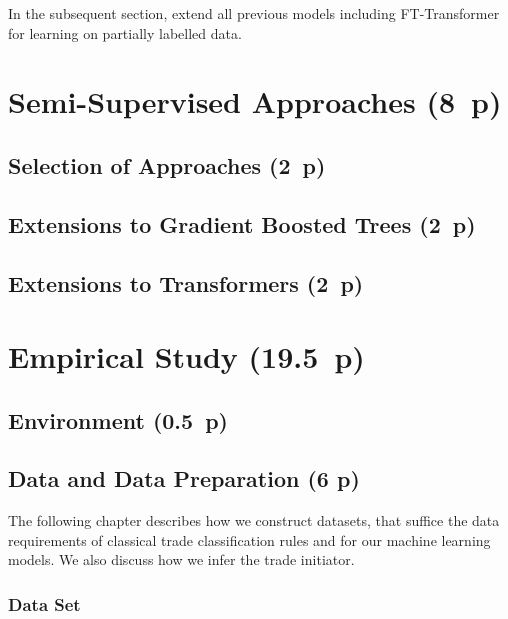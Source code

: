 In the subsequent section, extend all previous models including FT-Transformer for learning on partially labelled data.

\newpage
\section{Semi-Supervised Approaches (8~p)}\label{sec:semi-supervised-approaches}

\subsection{Selection of Approaches (2~p)}\label{sec:selection-of-approaches-1}

\subsection{Extensions to Gradient Boosted
    Trees (2~p)}\label{sec:extensions-to-gradient-boosted-trees}

\subsection{Extensions to Transformers (2~p)}\label{sec:extensions-to-transformer}


\newpage
\section{Empirical Study (19.5~p)}\label{sec:empirical-study}

\subsection{Environment (0.5~p)}\label{sec:environment}

\subsection{Data and Data Preparation (6 p)}\label{sec:data-and-data-preparation}

The following chapter describes how we construct datasets, that suffice the data requirements of classical trade classification rules and for our machine learning models. We also discuss how we infer the trade initiator.


\subsubsection{Data Set}\label{sec:dataset}

